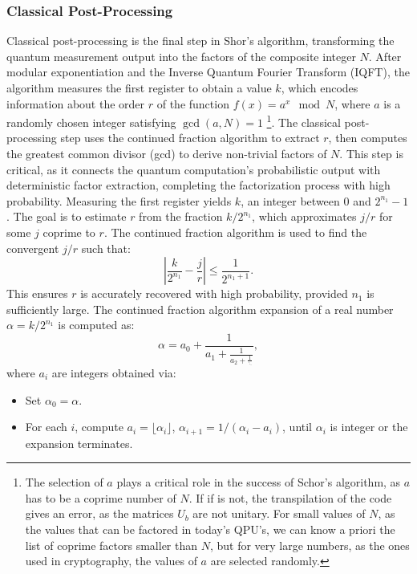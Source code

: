 \documentclass[conference,twoside]{IEEEtran}
\begin{document}
\subsubsection{Classical Post-Processing}
Classical post-processing is the final step in Shor's algorithm, transforming the quantum measurement output into the factors of the composite integer \( N \). After modular exponentiation and the Inverse Quantum Fourier Transform (IQFT), the algorithm measures the first register to obtain a value \( k \), which encodes information about the order \( r \) of the function \( f(x) = a^x \mod N \), where \( a \) is a randomly chosen integer satisfying \( \gcd(a, N) = 1 \) \footnote{The selection of \(a\) plays a critical role in the success of Schor's algorithm, as \(a\) has to be a coprime number of \(N\). If if is not, the transpilation of the code gives an error, as the matrices \(U_b\) are not unitary. For small values of \(N\), as the values that can be factored in today's QPU's, we can know a priori the list of coprime factors smaller than \(N\), but for very large numbers, as the ones used in cryptography, the values of \(a\) are selected randomly.}. The classical post-processing step uses the continued fraction algorithm to extract \( r \), then computes the greatest common divisor (gcd) to derive non-trivial factors of \( N \). This step is critical, as it connects the quantum computation’s probabilistic output with deterministic factor extraction, completing the factorization process with high probability.
Measuring the first register yields \( k \), an integer between 0 and \( 2^{n_1} - 1 \). The goal is to estimate \( r \) from the fraction \( k / 2^{n_1} \), which approximates \( j / r \) for some \( j \) coprime to \( r \). The continued fraction algorithm is used to find the convergent \( j/r \) such that:
\begin{equation}
\left| \frac{k}{2^{n_1}} - \frac{j}{r} \right| \leq \frac{1}{2^{n_1+1}}.
\end{equation}
This ensures \( r \) is accurately recovered with high probability, provided \( n_1 \) is sufficiently large. The continued fraction algorithm expansion of a real number \( \alpha = k / 2^{n_1} \) is computed as:
\begin{equation}
\alpha = a_0 + \frac{1}{a_1 + \frac{1}{a_2 + \frac{1}{\ddots}}},
\end{equation}
where \( a_i \) are integers obtained via:
\begin{itemize}
    \item Set \( \alpha_0 = \alpha \).
    \item For each \( i \), compute \( a_i = \lfloor \alpha_i \rfloor \), \( \alpha_{i+1} = 1 / (\alpha_i - a_i) \), until \( \alpha_i \) is integer or the expansion terminates.
\end{itemize}
\end{document}
